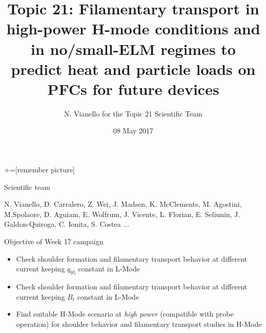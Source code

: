 \documentclass[10pt, compress]{beamer}
\title{{\small Topic 21: Filamentary transport in high-power H-mode conditions and in no/small-ELM regimes to predict heat and particle loads on PFCs for future devices }}
\date{08 May 2017}
\author[Topic 21 Scientific Team]{N. Vianello for the Topic 21 Scientific Team}
\begin{document}
+=[remember picture]
\maketitle
\begin{frame}{Scientific team}
  \begin{center}
N. Vianello, D. Carralero, Z. Wei, J. Madsen, K. McClements,
M. Agostini, M.Spolaore, D. Aguiam, E. Wolfrum, J. Vicente,
L. Florian, E. Seliunin, J. Galdon-Quiroga, C. Ionita, S. Costea ...
  \end{center}
\end{frame}
\begin{frame}{Objective of Week 17 campaign}
  \begin{itemize}[<+-|alert@+>]
    \item Check shoulder formation and filamentary transport behavior
      at different current keeping $q_{95}$ constant in L-Mode
    \item Check shoulder formation and filamentary transport behavior
      at different current keeping $B_{t}$ constant in L-Mode
    \item Find suitable H-Mode scenario at \emph{high power}
      (compatible with probe operation) for shoulder behavior and
      filamentary transport studies in H-Mode
  \end{itemize}    
\end{frame}
\end{document}
